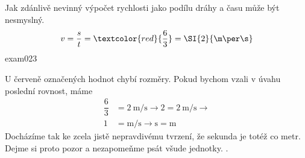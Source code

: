 \begin{fyzexam}{Jak zdánlivě nevinný výpočet rychlosti jako podílu dráhy a času může být nesmyslný.  
  \[v = \dfrac{s}{t} = \textcolor{red}{\dfrac{6}{3}} = \SI{2}{\m\per\s}\]}{exam023}    

  U červeně označených hodnot chybí rozměry. Pokud bychom vzali v úvahu poslední rovnost, máme
  \begin{align*}
    \dfrac{6}{3} &= \SI{2}{\m\per\s}  \rightarrow 2 = \SI{2}{\m\per\s}  \rightarrow \\
               1 &= \si{\m\per\s}     \rightarrow     \si{\s} = \si{\m} 
  \end{align*}
  Docházíme tak ke zcela jistě nepravdivému tvrzení, že sekunda je totéž co metr. Dejme si proto
  pozor a nezapomeňme psát všude jednotky. \cite[s.~1]{Kulhanek2020}. 
\end{fyzexam}